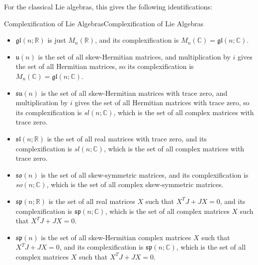 \documentclass[../main.tex]{subfiles}
\begin{document}
For the classical Lie algebras, this gives the following identifications:
\begin{proposition}{Complexification of Lie Algebras}{Complexification of Lie Algebras}
  \begin{itemize}
    \item $\mathfrak{gl}(n;\mathbb{R})$ is just $M_n(\mathbb{R})$, and its complexification is $M_n(\mathbb{C}) = \mathfrak{gl}(n;\mathbb{C})$.
    \item $\mathfrak{u}(n)$ is the set of all skew-Hermitian matrices, and multiplication by $i$ gives the set of all Hermitian matrices, so its complexification is $M_n(\mathbb{C})=\mathfrak{gl}(n;\mathbb{C})$.
    \item $\mathfrak{su}(n)$ is the set of all skew-Hermitian matrices with trace zero, and multiplication by $i$ gives the set of all Hermitian matrices with trace zero, so its complexification is $sl(n;\mathbb{C})$, which is the set of all complex matrices with trace zero.
    \item $\mathfrak{sl}(n;\mathbb{R})$ is the set of all real matrices with trace zero, and its complexification is $sl(n;\mathbb{C})$, which is the set of all complex matrices with trace zero.
    \item $\mathfrak{so}(n)$ is the set of all skew-symmetric matrices, and its complexification is $so(n;\mathbb{C})$, which is the set of all complex skew-symmetric matrices.
    \item $\mathfrak{sp}(n;\mathbb{R})$ is the set of all real matrices $X$ such that $X^T J + J X = 0$, and its complexification is $\mathfrak{sp}(n;\mathbb{C})$, which is the set of all complex matrices $X$ such that $X^T J + J X = 0$.
    \item $\mathfrak{sp}(n)$ is the set of all skew-Hermitian complex matrices $X$ such that $X^T J + J X = 0$, and its complexification is $\mathfrak{sp}(n;\mathbb{C})$, which is the set of all complex matrices $X$ such that $X^T J + J X = 0$.
  \end{itemize}
\end{proposition}
\end{document}
